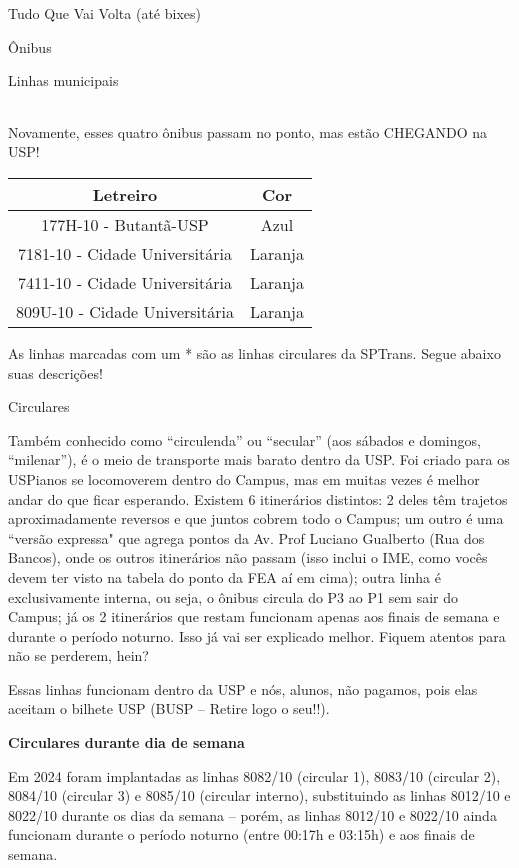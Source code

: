 \begin{secao}{Tudo Que Vai Volta (até bixes)}
\begin{subsecao}{Ônibus}
\begin{subsubsecao}{Linhas municipais}
\begin{center}
\begin{tabular}{|c|c|c|}
      \hline
	\end{tabular}
\end{center}

Novamente, esses quatro ônibus passam no ponto, mas estão CHEGANDO na USP!
\begin{center}
	\begin{tabular}{|c|c|}
	  \hline
	  Letreiro & Cor\\
	  \hline
	  177H-10 - Butantã-USP & Azul\\
	  7181-10 - Cidade Universitária & Laranja\\
	  7411-10 - Cidade Universitária & Laranja\\
	  809U-10 - Cidade Universitária & Laranja\\
	  \hline
	\end{tabular}
\end{center}

As linhas marcadas com um * são as linhas circulares da SPTrans.
Segue abaixo suas descrições!

\end{subsubsecao}

\begin{subsubsecao}{Circulares}

Também conhecido como ``circulenda'' ou ``secular'' (aos sábados e domingos,
``milenar''), é o meio de transporte mais barato dentro da USP. Foi criado para
os USPianos se locomoverem dentro do Campus, mas em muitas vezes é melhor andar
do que ficar esperando. Existem 6 itinerários distintos: 2 deles têm trajetos
aproximadamente reversos e que juntos cobrem todo o Campus; um outro é uma
``versão expressa" que agrega pontos da Av. Prof Luciano Gualberto (Rua dos 
Bancos), onde os outros itinerários não passam (isso inclui o IME, como vocês 
devem ter visto na tabela do ponto da FEA aí em cima); outra linha é exclusivamente 
interna, ou seja, o ônibus circula do P3 ao P1 sem sair do Campus; já os 2 itinerários 
que restam funcionam apenas aos finais de semana e durante o período noturno. Isso já 
vai ser explicado melhor. Fiquem atentos para não se perderem, hein?

Essas linhas funcionam dentro da USP e nós, alunos, não pagamos, pois elas aceitam o 
bilhete USP (BUSP -- Retire logo o seu!!).

{\bf Circulares durante dia de semana}

Em 2024 foram implantadas as linhas 8082/10 (circular 1), 8083/10 (circular 2), 
8084/10 (circular 3) e 8085/10 (circular interno), substituindo as linhas 8012/10 e 
8022/10 durante os dias da semana -- porém, as linhas 8012/10 e 8022/10 ainda funcionam 
durante o período noturno (entre 00:17h e 03:15h) e aos finais de semana. 


\end{subsubsecao}
\end{subsecao}
\end{secao}
